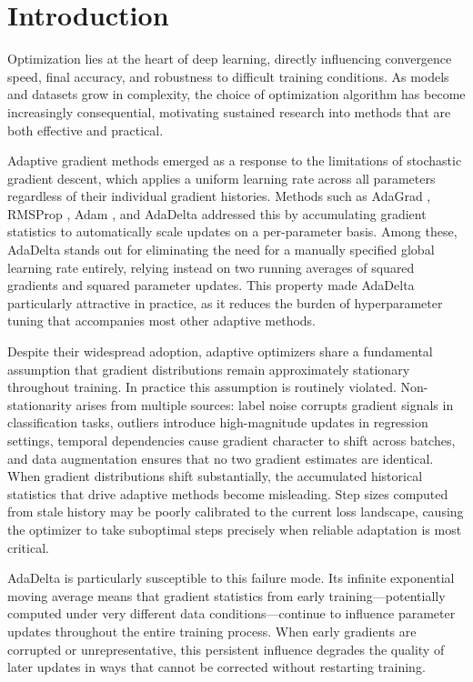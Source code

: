 \documentclass[11pt,a4paper]{article}
\begin{document}
\section{Introduction}

Optimization lies at the heart of deep learning, directly influencing convergence speed, final accuracy, and robustness to difficult training conditions. As models and datasets grow in complexity, the choice of optimization algorithm has become increasingly consequential, motivating sustained research into methods that are both effective and practical.

Adaptive gradient methods emerged as a response to the limitations of stochastic gradient descent, which applies a uniform learning rate across all parameters regardless of their individual gradient histories. Methods such as AdaGrad \citep{duchi2011adagrad}, RMSProp \citep{tieleman2012rmsprop}, Adam \citep{kingma2014adam}, and AdaDelta \citep{zeiler2012adadelta} addressed this by accumulating gradient statistics to automatically scale updates on a per-parameter basis. Among these, AdaDelta stands out for eliminating the need for a manually specified global learning rate entirely, relying instead on two running averages of squared gradients and squared parameter updates. This property made AdaDelta particularly attractive in practice, as it reduces the burden of hyperparameter tuning that accompanies most other adaptive methods.

Despite their widespread adoption, adaptive optimizers share a fundamental assumption that gradient distributions remain approximately stationary throughout training. In practice this assumption is routinely violated. Non-stationarity arises from multiple sources: label noise corrupts gradient signals in classification tasks, outliers introduce high-magnitude updates in regression settings, temporal dependencies cause gradient character to shift across batches, and data augmentation ensures that no two gradient estimates are identical. When gradient distributions shift substantially, the accumulated historical statistics that drive adaptive methods become misleading. Step sizes computed from stale history may be poorly calibrated to the current loss landscape, causing the optimizer to take suboptimal steps precisely when reliable adaptation is most critical.

AdaDelta is particularly susceptible to this failure mode. Its infinite exponential moving average means that gradient statistics from early training---potentially computed under very different data conditions---continue to influence parameter updates throughout the entire training process. When early gradients are corrupted or unrepresentative, this persistent influence degrades the quality of later updates in ways that cannot be corrected without restarting training.
\end{document}
